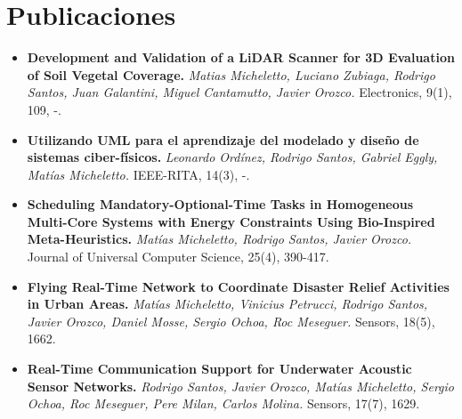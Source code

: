 \documentclass[letterpaper]{twentysecondcv} %
\begin{document}

\makeprofilesecond %

\section{Publicaciones}
{\begin{itemize}
\item {\bf Development and Validation of a LiDAR Scanner for 3D Evaluation of Soil Vegetal Coverage.} \textit{Matias Micheletto, Luciano Zubiaga, Rodrigo Santos, Juan Galantini, Miguel Cantamutto, Javier Orozco.}
Electronics, 9(1), 109, -.
\item {\bf Utilizando UML para el aprendizaje del modelado y diseño de sistemas ciber-físicos.} \textit{Leonardo Ordínez, Rodrigo Santos, Gabriel Eggly, Matías Micheletto.}
IEEE-RITA, 14(3), -.
\item {\bf Scheduling Mandatory-Optional-Time Tasks in Homogeneous Multi-Core Systems with Energy Constraints Using Bio-Inspired Meta-Heuristics.} \textit{Matías Micheletto, Rodrigo Santos, Javier Orozco.} Journal of Universal Computer Science, 25(4), 390-417.
\item {\bf Flying Real-Time Network to Coordinate Disaster Relief Activities in Urban Areas.} \textit{Matías Micheletto, Vinicius Petrucci, Rodrigo Santos, Javier Orozco, Daniel Mosse, Sergio Ochoa, Roc Meseguer.} Sensors, 18(5), 1662.
\item {\bf Real-Time Communication Support for Underwater Acoustic Sensor Networks.} \textit{Rodrigo Santos, Javier Orozco, Matías Micheletto, Sergio Ochoa, Roc Meseguer, Pere Milan, Carlos Molina.} Sensors, 17(7), 1629.
\end{itemize}}
\end{document}

